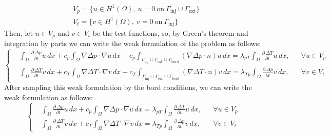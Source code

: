 \documentclass[a4paper,12pt]{report}
\begin{document}
\begin{equation}
\begin{aligned}
&V_p = \{u \in H^1(\Omega),\ u = 0\ \text{on}\ \Gamma_{\text{inj}} \cup \Gamma_{\text{ext}}\} \\
&V_t = \{v \in H^1(\Omega),\ v = 0\ \text{on}\ \Gamma_{\text{inj}}\}
\end{aligned}
\end{equation}
Then, let $u \in V_p $ and $v \in V_t$ be the test functions, so, by Green's theorem and integration by parts we can write the weak formulation of the problem as follows:
\begin{equation}
\left\{
\begin{aligned}
    &\int_{\Omega} \frac{\partial\, \Delta p}{\partial t} u \,dx + c_p \int_{\Omega} \nabla \Delta p \cdot \nabla u \,dx - c_p \int_{\Gamma_{\text{inj}} \cup \Gamma_{\text{ext}}\cup \Gamma_{\text{bord}}} (\nabla \Delta p \cdot n)  u \,dx   = \lambda_{pT} \int_{\Omega} \frac{\partial\, \Delta T}{\partial t} u \,dx,  && \forall u \in V_p \\[2mm]
    &\int_{\Omega} \frac{\partial\, \Delta T}{\partial t} v \,dx + c_T \int_{\Omega} \nabla \Delta T \cdot \nabla v \,dx - c_T \int_{\Gamma_{\text{inj}} \cup \Gamma_{\text{ext}}\cup \Gamma_{\text{bord}}} (\nabla \Delta T \cdot n)  v \,dx = \lambda_{Tp} \int_{\Omega} \frac{\partial\, \Delta p}{\partial t} v \,dx, && \forall v \in V_t
\end{aligned}
\right.
\end{equation}
After sampling this weak formulation by the bord conditions, we can write the weak formulation as follows:
\begin{equation}
\left\{
\begin{aligned}
    &\int_{\Omega} \frac{\partial\, \Delta p}{\partial t} u \,dx + c_p \int_{\Omega} \nabla \Delta p \cdot \nabla u \,dx  = \lambda_{pT} \int_{\Omega} \frac{\partial\, \Delta T}{\partial t} u \,dx,  && \forall u \in V_p \\[2mm]
    &\int_{\Omega} \frac{\partial\, \Delta T}{\partial t} v \,dx + c_T \int_{\Omega} \nabla \Delta T \cdot \nabla v \,dx  = \lambda_{Tp} \int_{\Omega} \frac{\partial\, \Delta p}{\partial t} v \,dx, && \forall v \in V_t
\end{aligned}
\right.
\end{equation}
\end{document}
